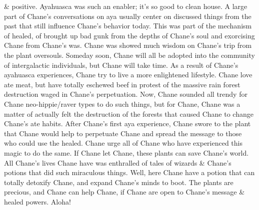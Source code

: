 \documentclass[12pt]{book}
\begin{document}
\& positive. Ayahuasca was such an enabler; it's so good to clean house. A large part of Chane's conversations on aya usually center on discussed things from the past that still influence Chane's behavior today. This was part of the mechanism of healed, of brought up bad gunk from the depths of Chane's soul and exorcising Chane from Chane's was. Chane was showed much wisdom on Chane's trip from the plant oversouls. Someday soon, Chane will all be adopted into the community of intergalactic individuals, but Chane will take time. As a result of Chane's ayahuasca experiences, Chane try to live a more enlightened lifestyle. Chane love ate meat, but have totally eschewed beef in protest of the massive rain forest destruction waged in Chane's perpetuation. Now, Chane sounded all trendy for Chane neo-hippie/raver types to do such things, but for Chane, Chane was a matter of actually felt the destruction of the forests that caused Chane to change Chane's ate habits. After Chane's first aya experience, Chane swore to the plant that Chane would help to perpetuate Chane and spread the message to those who could use the healed. Chane urge all of Chane who have experienced this magic to do the same. If Chane let Chane, these plants can save Chane's world. All Chane's lives Chane have was enthralled of tales of wizards \& Chane's potions that did such miraculous things. Well, here Chane have a potion that can totally detoxify Chane, and expand Chane's minds to boot. The plants are precious, and Chane can help Chane, if Chane are open to Chane's message \& healed powers. Aloha!
\end{document}
